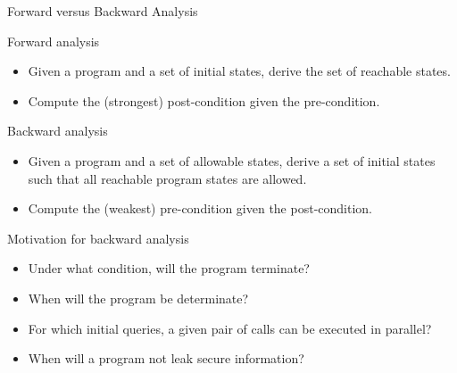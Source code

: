 \documentclass{beamer}
\begin{document}
\begin{frame}{Forward versus Backward Analysis}
\vspace{\fill}

\begin{minipage}{0.45\textwidth}
Forward analysis
\begin{itemize}
\item Given  a program and  a set of initial states, derive the
set of reachable states. 
\item Compute the (strongest) post-condition given the
pre-condition.
\end{itemize}
\end{minipage} \hspace{\fill}
\begin{minipage}{0.45\textwidth}
Backward analysis
\begin{itemize}
    \item Given a program and a set of allowable states, derive a set of initial states such that all reachable program states are allowed.
    \item Compute the (weakest) pre-condition given the post-condition.
\end{itemize}
\end{minipage}

\vspace{\fill}

\end{frame}

\begin{frame}{Motivation for backward analysis}
\vspace{\fill}

\begin{itemize}
    \item Under what condition, will the program terminate?
    \item When will the program be determinate?
    \item For which initial queries, a given pair of calls can be executed in parallel?
    \item When will a program not leak secure information?
\end{itemize}

\vspace{\fill}
\end{frame}
\end{document}
